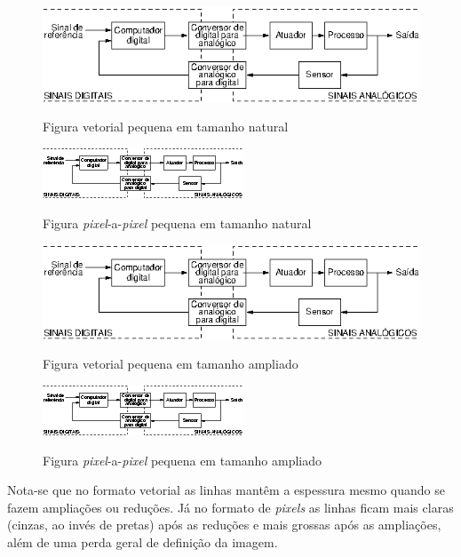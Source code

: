 \begin{figure}[htbp!] \begin{center}
\includegraphics{./figuras/smallvetorial}
\caption{Figura vetorial pequena em tamanho natural}
\label{Fig:smallvetorial}
\vspace{6mm}
\includegraphics{./figuras/smallbitmap}
\caption{Figura \emph{pixel}-a-\emph{pixel} pequena em tamanho natural}
\label{Fig:smallbitmap}
\vspace{6mm}
\includegraphics[width=\linewidth]{./figuras/smallvetorial}
\caption{Figura vetorial pequena em tamanho ampliado}
\label{Fig:smallvetorialampliada}
\vspace{6mm}
\includegraphics[width=\linewidth]{./figuras/smallbitmap}
\caption{Figura \emph{pixel}-a-\emph{pixel} pequena em tamanho ampliado}
\label{Fig:smallbitmapampliada}
\end{center} \end{figure}

Nota-se que no formato vetorial as
linhas mantêm a espessura mesmo quando se fazem
ampliações ou reduções. Já no formato de \emph{pixels}
as linhas ficam mais claras (cinzas, ao invés de pretas) após as
reduções e mais grossas após as ampliações, além de uma perda geral
de definição da imagem.

